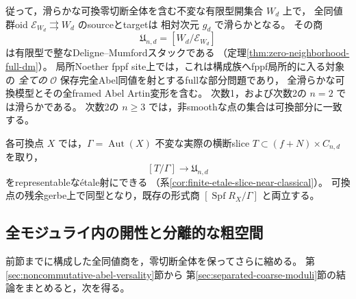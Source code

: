 \documentclass[a4paper,11pt]{ltjsarticle}
\numberwithin{equation}{section}
\theoremstyle{plain}
\theoremstyle{definition}
\theoremstyle{remark}
\begin{document}
従って，滑らかな可換零切断全体を含む不変な有限型開集合 $W_d$ 上で，
全同値群oid $\mathcal E_{W_d}\rightrightarrows W_d$ のsourceとtargetは
相対次元 $g_d$ で滑らかとなる。
その商
\[
             \mathfrak U_{n,d}=[W_d/\mathcal E_{W_d}]
\]
は有限型で整なDeligne--Mumfordスタックである
（定理\ref{thm:zero-neighborhood-full-dm}）。
局所Noether fppf site上では，これは構成族へfppf局所的に入る対象の
\emph{全ての} $\mathcal O$ 保存完全Abel同値を射とするfullな部分問題であり，
全滑らかな可換模型とその全framed Abel Artin変形を含む。
次数1，および次数2の $n=2$ では滑らかである。
次数2の $n\ge3$ では，非smoothな点の集合は可換部分に一致する。

各可換点 $X$ では，$\Gamma=\operatorname{Aut}(X)$ 不変な実際の横断slice
$T\subset(f+N)\times C_{n,d}$ を取り，
\[
                   [T/\Gamma]\longrightarrow\mathfrak U_{n,d}
\]
をrepresentableな\'{e}tale射にできる
（系\ref{cor:finite-etale-slice-near-classical}）。
可換点の残余gerbe上で同型となり，既存の形式商
$[\operatorname{Spf}R_X/\Gamma]$ と両立する。

\subsection{全モジュライ内の開性と分離的な粗空間}
前節までに構成した全同値商を，零切断全体を保ってさらに縮める。
第\ref{sec:noncommutative-abel-versality}節から
第\ref{sec:separated-coarse-moduli}節の結論をまとめると，次を得る。
\end{document}
